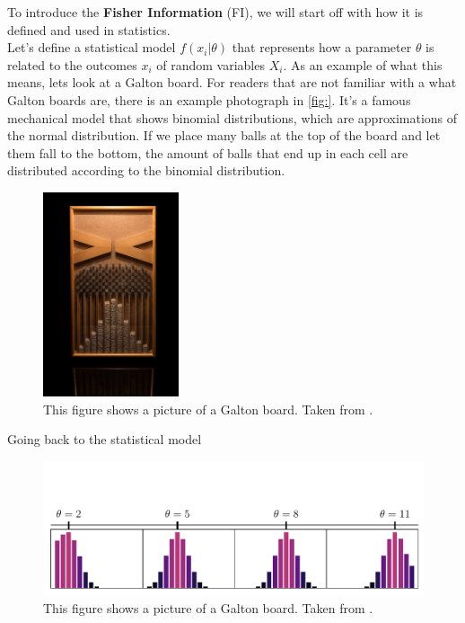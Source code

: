 To introduce the \textbf{Fisher Information} (FI), we will start off with how it is defined and used in statistics.\\
Let's define a statistical model $f(x_i|\theta)$ that represents how a parameter $\theta$ is related to the outcomes $x_i$ of random variables $X_i$\cite{StatisticFisherInfoTutorial}. As an example of what this means, lets look at a Galton board. For readers that are not familiar with a what Galton boards are, there is an example photograph in \cref{fig:}. It's a famous mechanical model that shows binomial distributions, which are approximations of the normal distribution. If we place many balls at the top of the board and let them fall to the bottom, the amount of balls that end up in each cell are distributed according to the binomial distribution. 
\begin{figure}
	\centering
	\includegraphics[width = 4cm]{text/FisherInformation/plots/GaltonBoard.jpg}
	\caption{This figure shows a picture of a Galton board. Taken from \cite{GaltonBoardPicture}.}
\end{figure}
Going back to the statistical model 
\begin{figure}
	\centering
	\includegraphics[width = \textwidth, clip, trim= 0cm 0cm 0cm 2.2cm]{text/FisherInformation/plots/GaltonDistributionsPlot.pdf}
	\caption{This figure shows a picture of a Galton board. Taken from \cite{fig:GaltonBoardPicture}.}
\end{figure}